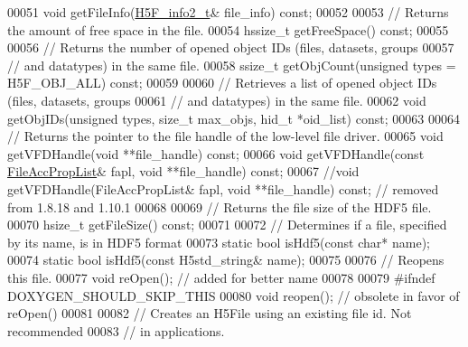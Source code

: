\begin{DoxyCode}
00051         \textcolor{keywordtype}{void} getFileInfo(\hyperlink{struct_h5_f__info2__t}{H5F\_info2\_t}& file\_info) \textcolor{keyword}{const};
00052 
00053         \textcolor{comment}{// Returns the amount of free space in the file.}
00054         hssize\_t getFreeSpace() \textcolor{keyword}{const};
00055 
00056         \textcolor{comment}{// Returns the number of opened object IDs (files, datasets, groups}
00057         \textcolor{comment}{// and datatypes) in the same file.}
00058         ssize\_t getObjCount(\textcolor{keywordtype}{unsigned} types = H5F\_OBJ\_ALL) \textcolor{keyword}{const};
00059 
00060         \textcolor{comment}{// Retrieves a list of opened object IDs (files, datasets, groups}
00061         \textcolor{comment}{// and datatypes) in the same file.}
00062         \textcolor{keywordtype}{void} getObjIDs(\textcolor{keywordtype}{unsigned} types, \textcolor{keywordtype}{size\_t} max\_objs, hid\_t *oid\_list) \textcolor{keyword}{const};
00063 
00064         \textcolor{comment}{// Returns the pointer to the file handle of the low-level file driver.}
00065         \textcolor{keywordtype}{void} getVFDHandle(\textcolor{keywordtype}{void} **file\_handle) \textcolor{keyword}{const};
00066         \textcolor{keywordtype}{void} getVFDHandle(\textcolor{keyword}{const} \hyperlink{class_h5_1_1_file_acc_prop_list}{FileAccPropList}& fapl, \textcolor{keywordtype}{void} **file\_handle) \textcolor{keyword}{const};
00067         \textcolor{comment}{//void getVFDHandle(FileAccPropList& fapl, void **file\_handle) const; // removed from 1.8.18 and
       1.10.1}
00068 
00069         \textcolor{comment}{// Returns the file size of the HDF5 file.}
00070         hsize\_t getFileSize() \textcolor{keyword}{const};
00071 
00072         \textcolor{comment}{// Determines if a file, specified by its name, is in HDF5 format}
00073         \textcolor{keyword}{static} \textcolor{keywordtype}{bool} isHdf5(\textcolor{keyword}{const} \textcolor{keywordtype}{char}* name);
00074         \textcolor{keyword}{static} \textcolor{keywordtype}{bool} isHdf5(\textcolor{keyword}{const} H5std\_string& name);
00075 
00076         \textcolor{comment}{// Reopens this file.}
00077         \textcolor{keywordtype}{void} reOpen();  \textcolor{comment}{// added for better name}
00078 
00079 \textcolor{preprocessor}{#ifndef DOXYGEN\_SHOULD\_SKIP\_THIS}
00080         \textcolor{keywordtype}{void} reopen();  \textcolor{comment}{// obsolete in favor of reOpen()}
00081 
00082         \textcolor{comment}{// Creates an H5File using an existing file id.  Not recommended}
00083         \textcolor{comment}{// in applications.}

\end{DoxyCode}
